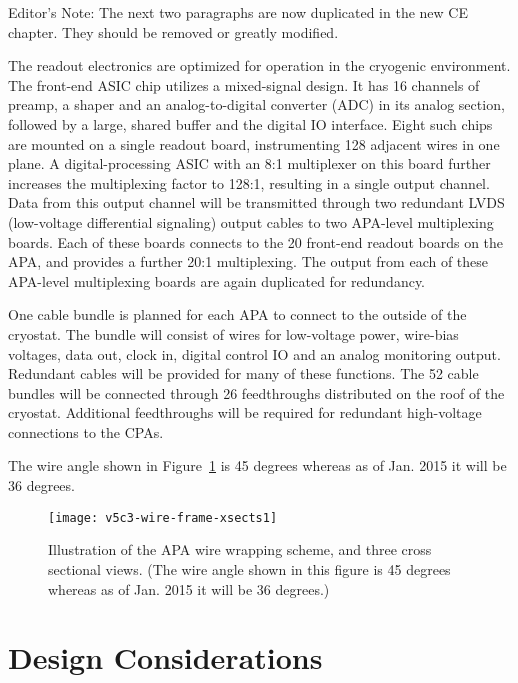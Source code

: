 \begin{editornote}
  Editor's Note:  The next two paragraphs are now duplicated in the new CE chapter. They should be removed or greatly modified.
\end{editornote}
The readout electronics are optimized for operation in the cryogenic environment.  
The front-end ASIC chip utilizes a mixed-signal design.  
It has 16 channels of preamp, a shaper and an analog-to-digital converter (ADC) in its analog section,  
followed by a large, shared buffer and the digital IO interface. Eight such chips 
are mounted on a single readout board, instrumenting 128 adjacent wires in one plane. 
A digital-processing ASIC with an 8:1 multiplexer on this board further 
increases the multiplexing factor to 128:1, resulting in a single output channel. Data from this output channel will be transmitted 
through two redundant LVDS (low-voltage differential signaling) output cables to two APA-level multiplexing boards.  Each of these boards connects to the 20 front-end readout boards on the APA, and provides a further 20:1 multiplexing.  The output from each of these APA-level multiplexing boards are again duplicated for redundancy.


One cable bundle is planned for each APA to connect to the outside of the cryostat. The bundle will consist of wires for low-voltage power, wire-bias voltages, data out, clock in, digital control IO and an analog monitoring output. Redundant cables will be provided for many of these functions. The 52 cable bundles will be connected through 26 feedthroughs distributed on the roof of the cryostat. Additional feedthroughs will be required for redundant high-voltage connections to the CPAs. 


\begin{editornote}
The wire angle shown in Figure~\ref{fig:tpc-wire-frame-xsect} is 45 degrees whereas as of Jan. 2015 it will be 36 degrees.
\end{editornote}


\begin{figure}[htpb]
\centering
\texttt{[image: v5c3-wire-frame-xsects1]}
\caption[Illustration of the APA wire wrapping scheme]{Illustration of the APA wire wrapping scheme, and three cross sectional views. (The wire angle shown in this figure is 45 degrees whereas as of Jan. 2015 it will be 36 degrees.)} 
\label{fig:tpc-wire-frame-xsect}
\end{figure}

\section{Design Considerations} 
\label{sec:v5-tpc-reqs-n-specs}

